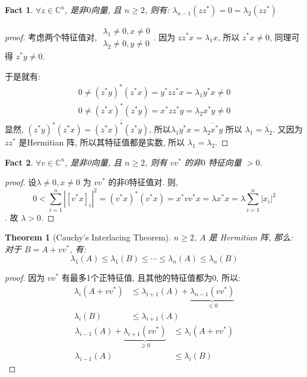 \documentclass{article}
\newtheorem{fact}{Fact}
\newtheorem*{theorem}{Theorem}
\begin{document}
\begin{fact}
  $\forall z\in \mathbb{C}^n$, 是非$0$向量, 且 $n\geq 2$, 则有:
  $\lambda_{n-1}(zz^*) = 0 = \lambda_2(zz^*)$
\end{fact}
\begin{proof}[proof]
  考虑两个特征值对, $\substack{\lambda_1 \not= 0, x\not= 0 \\ \lambda_2 \not=0, y\not=0}$.
  因为 $zz^*x = \lambda_1x$, 所以 $z^*x \not= 0$, 同理可得 $z^*y\not=0$.
  
  于是就有:
  \begin{align*}
    0 \not= (z^*y)^*(z^*x) = y^*zz^*x = \lambda_1 y^*x \not= 0 \\
    0 \not= (z^*x)^*(z^*y) = x^*zz^*y = \lambda_2 x^*y \not= 0 
  \end{align*}
  显然, $(z^*y)^*(z^*x) = \overline{(z^*x)^*(z^*y)}$, 所以$\lambda_1y^*x = \overline{\lambda_2x^*y}$
  所以 $\lambda_1 = \overline{\lambda_2}$.
  又因为 $zz^*$ 是Hermitian 阵, 所以其特征值都是实数, 所以 $\lambda_1 = \lambda_2$.
\end{proof}
\begin{fact}
  $\forall v\in\mathbb{C}^n$, 是非0向量, 且 $n \geq 2$, 则有 $vv^*$ 的非$0$ 特征向量 $>0$.
\end{fact}
\begin{proof}[proof]
  设$\lambda \not=0, x\not=0$ 为 $vv^*$ 的非$0$特征值对. 则,
  \[0 < \sum_{i=1}^n |[v^*x]_i|^2 = (v^*x)^*(v^*x) = x^*vv^*x = \lambda x^*x = \lambda \sum_{i=1}^n |x_i|^2\].
  故 $\lambda > 0$.
\end{proof}
\begin{theorem}[Cauchy's Interlacing Theorem]
  $n \geq 2$, $A$ 是 Hermitian 阵, 那么: 对于 $B = A + vv^*$, 有:
  \[\lambda_1(A) \leq \lambda_1(B) \leq \cdots \leq \lambda_{n}(A) \leq \lambda_n(B)\]
\end{theorem}
\begin{proof}[proof]
  因为 $vv^*$ 有最多1个正特征值, 且其他的特征值都为0, 所以:
  \begin{align*}
    \lambda_i(A + vv^*) &\leq \lambda_{i+1}(A) + \underbrace{\lambda_{n-1}(vv^*)}_{\leq 0} \\
    \lambda_i(B) &\leq \lambda_{i+1}(A)
  \end{align*}
  \begin{align*}
    \lambda_{i-1}(A) + \underbrace{\lambda_{i+1}(vv^*)}_{\geq 0} &\leq \lambda_i(A + vv^*) \\
    \lambda_{i-1}(A) &\leq \lambda_i(B)
  \end{align*}
\end{proof}
\end{document}
